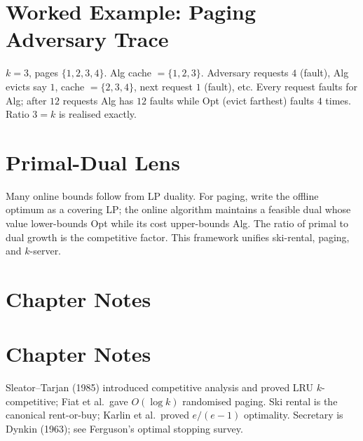 \section{Worked Example: Paging Adversary Trace}
\label{sec:paging-trace}

$k=3$, pages $\{1,2,3,4\}$. Alg cache $=\{1,2,3\}$. Adversary requests $4$ (fault), Alg evicts say $1$, cache $=\{2,3,4\}$, next request $1$ (fault), etc. Every request faults for Alg; after $12$ requests Alg has $12$ faults while Opt (evict farthest) faults $4$ times. Ratio $3=k$ is realised exactly.

\section{Primal-Dual Lens}
\label{sec:primal-dual}

Many online bounds follow from LP duality. For paging, write the offline optimum as a covering LP; the online algorithm maintains a feasible dual whose value lower-bounds Opt while its cost upper-bounds Alg. The ratio of primal to dual growth is the competitive factor. This framework unifies ski-rental, paging, and $k$-server.

\section{Chapter Notes}
\section{Chapter Notes}
Sleator--Tarjan (1985) introduced competitive analysis and proved LRU $k$-competitive; Fiat et al.\ gave $O(\log k)$ randomised paging. Ski rental is the canonical rent-or-buy; Karlin et al.\ proved $e/(e-1)$ optimality. Secretary is Dynkin (1963); see Ferguson's optimal stopping survey.

